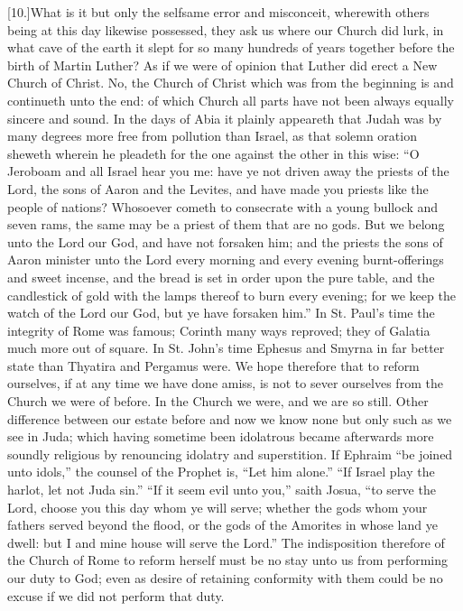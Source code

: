 [10.]What is it but only the selfsame error and misconceit,  wherewith others being at this day likewise possessed, they ask us where our Church did lurk, in what cave of the earth it slept for so many hundreds of years together before the birth of Martin Luther? As if we were of opinion that Luther did erect a New Church of Christ. No, the Church of Christ which was from the beginning is and continueth unto the end: of which Church all parts have not been always equally sincere and sound. In the days of Abia it plainly appeareth that Judah was by many degrees more free from pollution than Israel, as that solemn oration sheweth wherein he pleadeth for the one against the other in this wise: “O Jeroboam and all Israel hear you me: have ye not driven away the priests of the Lord, the sons of Aaron and the Levites, and have made you priests like the people of nations? Whosoever cometh to consecrate with a young bullock and seven rams, the same may be a priest of them that are no gods. But we belong unto the Lord our God, and have not forsaken him; and the priests the sons of Aaron minister unto the Lord every morning and every evening burnt-offerings and sweet incense, and the bread is set in order upon the pure table, and the candlestick of gold with the lamps thereof to burn every evening; for we keep the watch of the Lord our God, but ye have forsaken him.” In St. Paul’s time the integrity of Rome was famous; Corinth many ways reproved; they of Galatia much more out of square. In St. John’s time Ephesus and Smyrna in far better state than Thyatira and Pergamus were. We hope therefore that to reform ourselves, if at any time we have done amiss, is not to sever ourselves from the Church we were of  before. In the Church we were, and we are so still. Other difference between our estate before and now we know none but only such as we see in Juda; which having sometime been idolatrous became afterwards more soundly religious by renouncing idolatry and superstition. If Ephraim “be joined unto idols,” the counsel of the Prophet is, “Let him alone.” “If Israel play the harlot, let not Juda sin.” “If it seem evil unto you,” saith Josua, “to serve the Lord, choose you this day whom ye will serve; whether the gods whom your fathers served beyond the flood, or the gods of the Amorites in whose land ye dwell: but I and mine house will serve the Lord.” The indisposition therefore of the Church of Rome to reform herself must be no stay unto us from performing our duty to God; even as desire of retaining conformity with them could be no excuse if we did not perform that duty.

